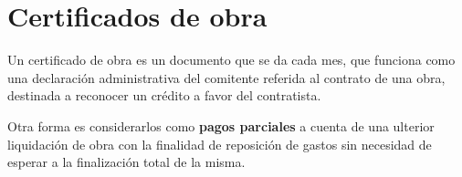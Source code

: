 \documentclass[../main.tex]{subfiles}
\begin{document}
\section{Certificados de obra}

Un certificado de obra es un documento que se da cada mes, que funciona como una
declaración administrativa del comitente referida al contrato de una obra,
destinada a reconocer un crédito a favor del contratista. 

Otra forma es considerarlos como \textbf{pagos parciales} a cuenta de una
ulterior liquidación de obra con la finalidad de reposición de gastos sin
necesidad de esperar a la finalización total de la misma.
\end{document}
